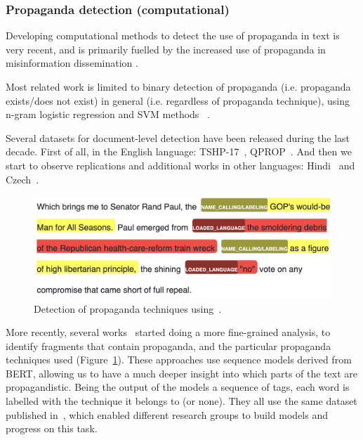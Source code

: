 \subsubsection{Propaganda detection (computational)}
\label{ssec:lit_propaganda_detection}

Developing computational methods to detect the use of propaganda in text is very recent, and is primarily fuelled by the increased use of propaganda in misinformation dissemination \citep{da2020survey}.

Most related work is limited to binary detection of propaganda (i.e. propaganda exists/does not exist) in general (i.e. regardless of propaganda technique), using n-gram logistic regression and SVM methods ~\citep{rashkin2017truth,barron2019proppy}.


Several datasets for document-level detection have been released during the last decade.
First of all, in the English language:
TSHP-17~\citep{rashkin2017truth},
QPROP~\citep{alberto_barron_cedeno_2019_3271522}.
And then we start to observe replications and additional works in other languages: Hindi~\citep{chaudhari2022h,chaudhari_deptii_2022_5828240}
and Czech~\citep{baisa2019benchmark}.

\begin{figure}[!htb]
    \centering
    \includegraphics[width=\linewidth]{figures/propaganda_example_1_color.png}
    \caption{Detection of propaganda techniques using~\citet{baly2020we}.%
    }
    \label{fig:propaganda_example_1}
\end{figure}

More recently, several works~\citep{da2019fine,yoosuf2019fine,vorakitphan2022protect} started doing a more fine-grained analysis, to identify fragments that contain propaganda, and the particular propaganda techniques used (Figure~\ref{fig:propaganda_example_1}).
These approaches use sequence models derived from BERT, allowing us to have a much deeper insight into which parts of the text are propagandistic. Being the output of the models a sequence of tags, each word is labelled with the technique it belongs to (or none).
They all use the same dataset published in~\cite{da2019fine}, which enabled different research groups to build models and progress on this task.



